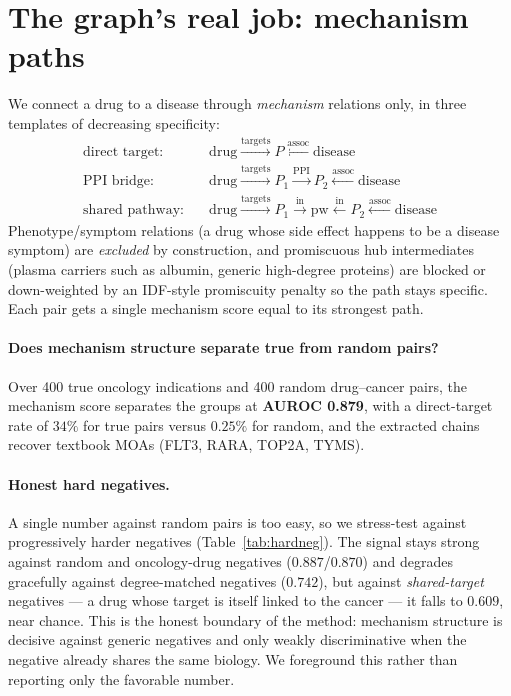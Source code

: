 \documentclass[11pt]{article}
\begin{document}
\section{The graph's real job: mechanism paths}\label{sec:mech}
We connect a drug to a disease through \emph{mechanism} relations only, in three templates of
decreasing specificity:
\[
\begin{aligned}
\text{direct target:}\quad & \text{drug}\xrightarrow{\text{targets}} P \xleftarrow{\text{assoc}} \text{disease}\\
\text{PPI bridge:}\quad & \text{drug}\xrightarrow{\text{targets}} P_1 \xrightarrow{\text{PPI}} P_2 \xleftarrow{\text{assoc}} \text{disease}\\
\text{shared pathway:}\quad & \text{drug}\xrightarrow{\text{targets}} P_1 \xrightarrow{\text{in}} \text{pw} \xleftarrow{\text{in}} P_2 \xleftarrow{\text{assoc}} \text{disease}
\end{aligned}
\]
Phenotype/symptom relations (a drug whose side effect happens to be a disease symptom) are
\emph{excluded} by construction, and promiscuous hub intermediates (plasma carriers such as
albumin, generic high-degree proteins) are blocked or down-weighted by an IDF-style
promiscuity penalty so the path stays specific. Each pair gets a single mechanism score equal
to its strongest path.

\paragraph{Does mechanism structure separate true from random pairs?} Over 400 true
oncology indications and 400 random drug--cancer pairs, the mechanism score separates the
groups at \textbf{AUROC 0.879}, with a direct-target rate of $34\%$ for true pairs versus
$0.25\%$ for random, and the extracted chains recover textbook MOAs (FLT3, RARA, TOP2A,
TYMS).

\paragraph{Honest hard negatives.} A single number against random pairs is too easy, so we
stress-test against progressively harder negatives (Table~\ref{tab:hardneg}). The signal
stays strong against random and oncology-drug negatives ($0.887$/$0.870$) and degrades
gracefully against degree-matched negatives ($0.742$), but against \emph{shared-target}
negatives --- a drug whose target is itself linked to the cancer --- it falls to $0.609$,
near chance. This is the honest boundary of the method: mechanism structure is decisive
against generic negatives and only weakly discriminative when the negative already shares the
same biology. We foreground this rather than reporting only the favorable number.
\end{document}
